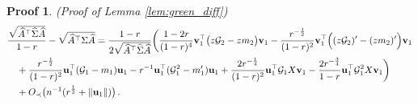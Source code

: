 \documentclass[12pt]{article}
\numberwithin{equation}{section}
\newtheorem{myPro}{Proof}
\theoremstyle{remark}
\newcommand{\1}{{\rm 1}\kern-0.24em{\rm I}}
\begin{document}
\begin{appendices}
\begin{myPro}{(Proof of Lemma \ref{lem:green_diff})}
\begin{align*}
&\frac{\sqrt{ \widehat A^{\top}\widehat\Sigma \widehat A }}{1-r} - \sqrt{\widehat A^{\top}\Sigma \widehat A} = \frac{1-r}{2\sqrt{\widehat A^{\top}\widehat\Sigma \widehat A }} \bigg( \frac{1-2r}{(1-r)^4}  {\bf v}_1^{\top}\big( z\mathcal{G}_2-zm_2\big){\bf v}_1  - \frac{r^{-\frac12}}{(1-r)^2} {\bf v}_1^{\top}\Big((z\mathcal{G}_2)'-(zm_2)'\Big){\bf v}_1 \notag\\
& \quad +  \frac{r^{-\frac12}}{(1-r)^2} {\bf u}_1^{\top}(\mathcal{G}_1-m_1){\bf u}_1 - r^{-1}{\bf u}_1^{\top}(\mathcal{G}_1^2- m_1'){\bf u}_1 +  \frac{2r^{-\frac14}}{(1-r)^2} {\bf u}_1^{\top}\mathcal{G}_1 {X}{\bf v}_1 - \frac{2r^{-\frac 34}}{1-r}  {\bf u}_1^{\top}\mathcal{G}_1^2 {X}{\bf v}_1\bigg) \notag\\
& \quad + O_\prec\big(n^{-1}( r^{\frac 12} + \Vert {\bf u}_1 \Vert )\big)\,.
\end{align*}

\end{myPro}
\end{appendices}
\end{document}

